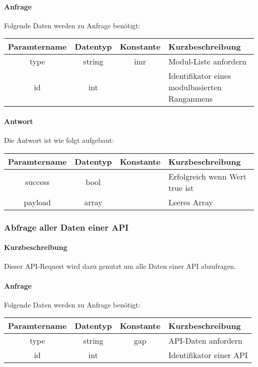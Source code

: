 \paragraph{Anfrage}Folgende Daten werden zu Anfrage benötigt:
\begin{table}[H]
	\begin{tabular}{|c|c|c|p{6.5cm}|}
		\hline
		\textbf{Paramtername} & \textbf{Datentyp} & \textbf{Konstante} & \textbf{Kurzbeschreibung}                                                                                               \\ \hline
		type                & string            & imr                & Modul-Liste anfordern \\ \hline
		id                  & int               &                    & Identifikator eines modulbasierten Ranganmens \\ \hline
	\end{tabular}
\end{table}
\paragraph{Antwort}Die Antwort ist wie folgt aufgebaut:
\begin{table}[H]
	\begin{tabular}{|c|c|c|p{6.5cm}|}
		\hline
		\textbf{Paramtername} & \textbf{Datentyp} & \textbf{Konstante} & \textbf{Kurzbeschreibung}            \\ \hline                
		success             & bool             &                 & Erfolgreich wenn Wert {\glqq true\grqq} ist \\ \hline
		payload             & array            &                 & Leeres Array \\ \hline
	\end{tabular}
\end{table}
\subsubsection{Abfrage aller Daten einer API}
\paragraph{Kurzbeschreibung}Dieser API-Request wird dazu genutzt um alle Daten einer API abzufragen.
\paragraph{Anfrage}Folgende Daten werden zu Anfrage benötigt:
\begin{table}[H]
	\begin{tabular}{|c|c|c|p{6.5cm}|}
		\hline
		\textbf{Paramtername} & \textbf{Datentyp} & \textbf{Konstante} & \textbf{Kurzbeschreibung}                                                                                               \\ \hline
		type                & string            & gap                & API-Daten anfordern \\ \hline
		id                  & int               &                    & Identifikator einer API \\ \hline
	\end{tabular}
\end{table}
